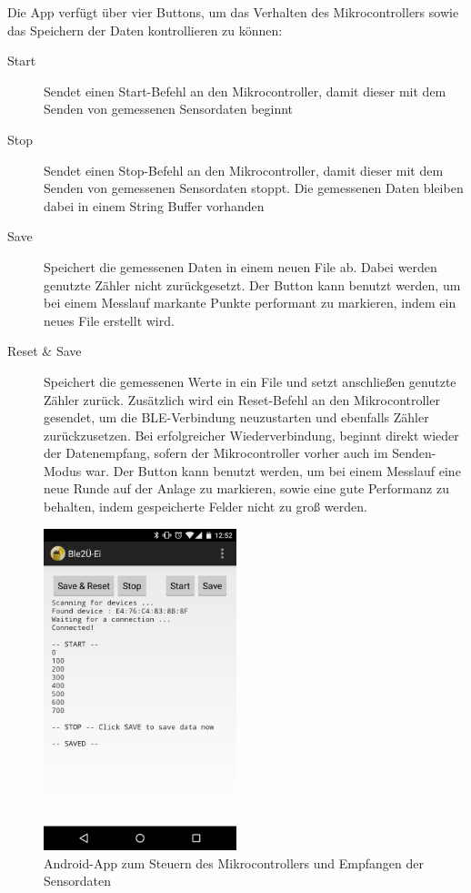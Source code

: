 Die App verfügt über vier Buttons, um das Verhalten des Mikrocontrollers sowie das Speichern der Daten kontrollieren zu können:
\begin{description}
	\item[Start] Sendet einen Start-Befehl an den Mikrocontroller, damit dieser mit dem Senden von gemessenen Sensordaten beginnt
	\item[Stop] Sendet einen Stop-Befehl an den Mikrocontroller, damit dieser mit dem Senden von gemessenen Sensordaten stoppt. Die gemessenen Daten bleiben dabei in einem String Buffer vorhanden
	\item[Save] Speichert die gemessenen Daten in einem neuen File ab. Dabei werden genutzte Zähler nicht zurückgesetzt. Der Button kann benutzt werden, um bei einem Messlauf markante Punkte performant zu markieren, indem ein neues File erstellt wird.
	\item[Reset \& Save] Speichert die gemessenen Werte in ein File und setzt anschließen genutzte Zähler zurück. Zusätzlich wird ein Reset-Befehl an den Mikrocontroller gesendet, um die BLE-Verbindung neuzustarten und ebenfalls Zähler zurückzusetzen. Bei erfolgreicher Wiederverbindung, beginnt direkt wieder der Datenempfang, sofern der Mikrocontroller vorher auch im Senden-Modus war. Der Button kann benutzt werden, um bei einem Messlauf eine neue Runde auf der Anlage zu markieren, sowie eine gute Performanz zu behalten, indem gespeicherte Felder nicht zu groß werden.
\end{description}

\begin{figure}[h]
	\centering
	\includegraphics[width=0.5\textwidth]{images/k3-androidapp.png}
	\caption {Android-App zum Steuern des Mikrocontrollers und Empfangen der Sensordaten}
	\label{fig:k3_androidapp}
\end{figure}

